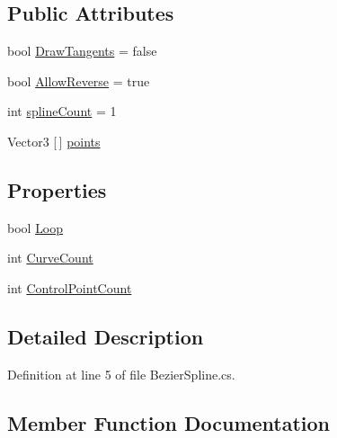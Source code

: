 \subsection*{Public Attributes}
\begin{DoxyCompactItemize}
\item 
bool \mbox{\hyperlink{class_bezier_spline_ad2ede07ef29ceb9b8bb226f35a1a66c8}{Draw\+Tangents}} = false
\item 
bool \mbox{\hyperlink{class_bezier_spline_a4225d2d179b33b5289878818daa8024e}{Allow\+Reverse}} = true
\item 
int \mbox{\hyperlink{class_bezier_spline_ad070f5934fd8050759032c828c9c242d}{spline\+Count}} = 1
\item 
Vector3 \mbox{[}$\,$\mbox{]} \mbox{\hyperlink{class_bezier_spline_adda54d62157465856c511f0b94fd78d9}{points}}
\end{DoxyCompactItemize}
\subsection*{Properties}
\begin{DoxyCompactItemize}
\item 
bool \mbox{\hyperlink{class_bezier_spline_a9b13fb8edeb86c6166fbd091b044eb63}{Loop}}
\item 
int \mbox{\hyperlink{class_bezier_spline_a953275346ac1b490473e3500c06b6286}{Curve\+Count}}
\item 
int \mbox{\hyperlink{class_bezier_spline_acb5b34c12c98bdf6b0ec0917009b1626}{Control\+Point\+Count}}
\end{DoxyCompactItemize}


\subsection{Detailed Description}


Definition at line 5 of file Bezier\+Spline.\+cs.



\subsection{Member Function Documentation}
\mbox{\label{class_bezier_spline_a4676e1c6d2cfc8454c028e30d54783bd}} 
